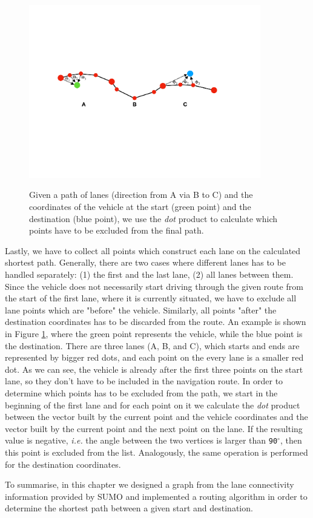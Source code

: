 \begin{figure}[htb]
	\centering
	\includegraphics[width=0.9\textwidth]{figures/navpoints}
	\label{fig:navpoints}
	\caption{Given a path of lanes (direction from A via B to C) and the coordinates of the vehicle at the start (green point) and the destination (blue point), we use the \emph{dot} product to calculate which points have to be excluded from the final path.}
\end{figure}

Lastly, we have to collect all points which construct each lane on the calculated shortest path. Generally, there are two cases where different lanes has to be handled separately: (1) the first and the last lane, (2) all lanes between them. Since the vehicle does not necessarily start driving through the given route from the start of the first lane, where it is currently situated, we have to exclude all lane points which are "before" the vehicle. Similarly, all points "after" the destination coordinates has to be discarded from the route. An example is shown in Figure \ref{fig:navpoints}, where the green point represents the vehicle, while the blue point is the destination. There are three lanes (A, B, and C), which starts and ends are represented by bigger red dots, and each point on the every lane is a smaller red dot. As we can see, the vehicle is already after the first three points on the start lane, so they don't have to be included in the navigation route. In order to determine which points has to be excluded from the path, we start in the beginning of the first lane and for each point on it we calculate the \emph{dot} product between the vector built by the current point and the vehicle coordinates and the vector built by the current point and the next point on the lane. If the resulting value is negative, \emph{i.e.} the angle between the two vertices is larger than \texttt{90$^{\circ}$}, then this point is excluded from the list. Analogously, the same operation is performed for the destination coordinates.

To summarise, in this chapter we designed a graph from the lane connectivity information provided by SUMO and implemented a routing algorithm in order to determine the shortest path between a given start and destination. 
